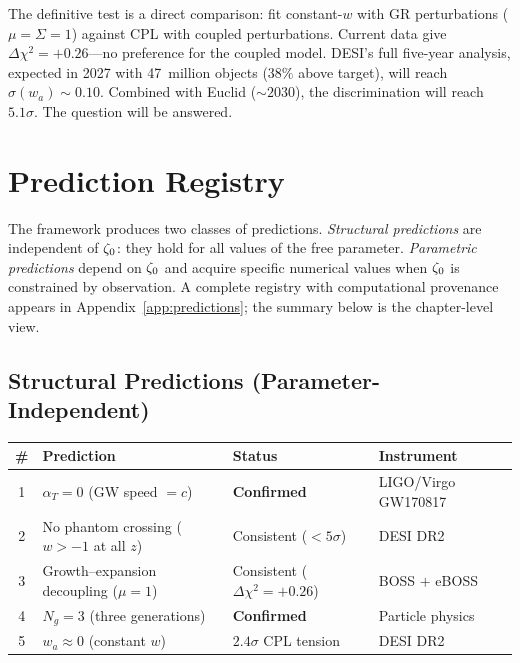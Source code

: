 The definitive test is a direct comparison: fit constant-$w$ with GR
perturbations ($\mu = \Sigma = 1$) against CPL with coupled
perturbations. Current data give $\Delta\chi^2 = +0.26$---no preference
for the coupled model. DESI's full five-year analysis, expected in
2027 with 47~million objects ($38\%$ above target), will reach
$\sigma(w_a) \sim 0.10$. Combined with Euclid ($\sim\!2030$), the
discrimination will reach $5.1\sigma$. The question will be answered.

\section{Prediction Registry}
\label{sec:0-registry}

The framework produces two classes of predictions. \emph{Structural
predictions} are independent of $\zeta_0$: they hold for all values of the
free parameter. \emph{Parametric predictions} depend on $\zeta_0$ and
acquire specific numerical values when $\zeta_0$ is constrained by
observation. A complete registry with computational provenance appears
in Appendix~\ref{app:predictions}; the summary below is the
chapter-level view.

\subsection*{Structural Predictions (Parameter-Independent)}

\begin{center}
\small
\begin{tabular}{@{}c p{6.1cm} p{3.4cm} l@{}}
\toprule
\textbf{\#} & \textbf{Prediction} & \textbf{Status} & \textbf{Instrument} \\
\midrule
1 & $\alpha_T = 0$ (GW speed $=c$) & \textbf{Confirmed} & LIGO/Virgo GW170817~\cite{ch1:gw170817} \\
2 & No phantom crossing ($w > -1$ at all $z$) & Consistent ($<5\sigma$) & DESI DR2~\cite{ch1:desi25} \\
3 & Growth--expansion decoupling ($\mu = 1$) & Consistent ($\Delta\chi^2 = +0.26$) & BOSS $+$ eBOSS \\
4 & $N_g = 3$ (three generations) & \textbf{Confirmed} & Particle physics \\
5 & $w_a \approx 0$ (constant $w$) & $2.4\sigma$ CPL tension & DESI DR2 \\
\bottomrule
\end{tabular}
\end{center}

